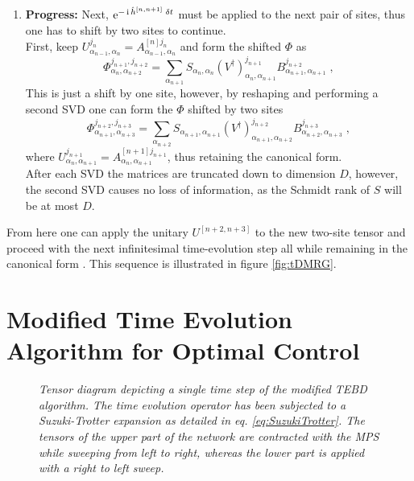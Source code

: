 \begin{enumerate}
\item
\textbf{Progress:}  Next, $\operatorname{e}^{- \operatorname{i} \hat{h}^{[n , n+1]} \; \delta t }$ must be applied to the next pair of sites, thus one has to shift by two sites to continue.\\
First, keep $U_{\alpha_{n-1} , \alpha_{n}}^{j_n } = A_{\alpha_{n-1} , \alpha_{n}}^{[n] j_n }$ and form the shifted $\Phi$ as
\begin{equation}
	\Phi_{\alpha_{n} , \alpha_{n+2}}^{j_{n+1} , j_{n+2}} = \sum_{\alpha_{n+1}}  S_{\alpha_n , \alpha_n} (V^{\dag})_{\alpha_{n} , \alpha_{n+1}}^{j_{n+1} } B_{\alpha_{n+1} , \alpha_{n+1}}^{j_{n+2}} \; ,
\end{equation}
This is just a shift by one site, however, by reshaping and performing a second SVD one can form the $\Phi$ shifted by two sites
\begin{equation}
	\Phi_{\alpha_{n+1} , \alpha_{n+3}}^{j_{n+2} , j_{n+3}} = \sum_{\alpha_{n+2}}  S_{\alpha_{n+1} , \alpha_{n+1}} (V^{\dag})_{\alpha_{n+1} , \alpha_{n+2}}^{j_{n+2} } B_{\alpha_{n+2} , \alpha_{n+3}}^{j_{n+3}} \; ,
\end{equation}
where $U_{\alpha_{n} , \alpha_{n+1}}^{j_{n+1} } = A_{\alpha_{n} , \alpha_{n+1}}^{[n+1] j_{n+1} }$, thus retaining the canonical form.\\
After each SVD the matrices are truncated down to dimension $D$, however, the second SVD causes no loss of information, as the Schmidt rank of $S$ will be at most $D$. 
\end{enumerate}
From here one can apply the unitary $U^{[n+2 , n+3]}$ to the new two-site tensor and proceed with the next infinitesimal time-evolution step all while remaining in the canonical form \cite{Schollwock}. This sequence is illustrated in figure \ref{fig:tDMRG}.

\section{Modified Time Evolution Algorithm for Optimal Control}

\begin{figure}[h!]
	\centering
	
	\caption{\textit{Tensor diagram depicting a single time step of the modified TEBD algorithm. The time evolution operator has been subjected to a Suzuki-Trotter expansion as detailed in eq. \eqref{eq:SuzukiTrotter}. The tensors of the upper part of the network are contracted with the MPS while sweeping from left to right, whereas the lower part is applied with a right to left sweep.}}
	\label{fig:ModifiedTEBD}
\end{figure}


